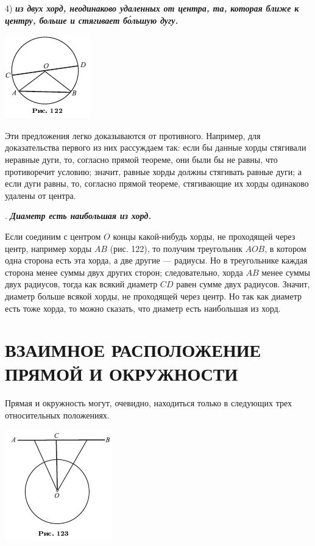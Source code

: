 \documentclass[oneside]{book}
\begin{document}
4) \textbf{\emph{из двух хорд, неодинаково удаленных от центра, та, которая ближе к центру, больше и стягивает б\'{о}льшую дугу.}}

\includegraphics{pics/ris-122}

Эти предложения легко доказываются от противного.
Например, для доказательства первого из них рассуждаем так:
если бы данные хорды стягивали неравные дуги, то, согласно прямой теореме, они были бы не равны, что противоречит условию;
значит, равные хорды должны стягивать равные дуги;
а если дуги равны, то, согласно прямой теореме, стягивающие их хорды одинаково удалены от центра.

.
\textbf{\emph{Диаметр есть наибольшая из хорд.}}

Если соединим с центром $O$ концы какой-нибудь хорды, не проходящей через центр, например хорды $AB$ (рис. 122), то получим треугольник $AOB$, в котором одна сторона есть эта хорда, а две другие — радиусы.
Но в треугольнике каждая сторона менее суммы двух других сторон;
следовательно, хорда $AB$ менее суммы двух радиусов, тогда как всякий диаметр $CD$ равен сумме двух радиусов.
Значит, диаметр больше всякой хорды, не проходящей через центр.
Но так как диаметр есть тоже хорда, то можно сказать, что диаметр есть наибольшая из хорд.

\section{ВЗАИМНОЕ РАСПОЛОЖЕНИЕ ПРЯМОЙ И ОКРУЖНОСТИ}

Прямая и окружность могут, очевидно, находиться только в следующих трех относительных положениях.

\includegraphics{pics/ris-123}
\end{document}
